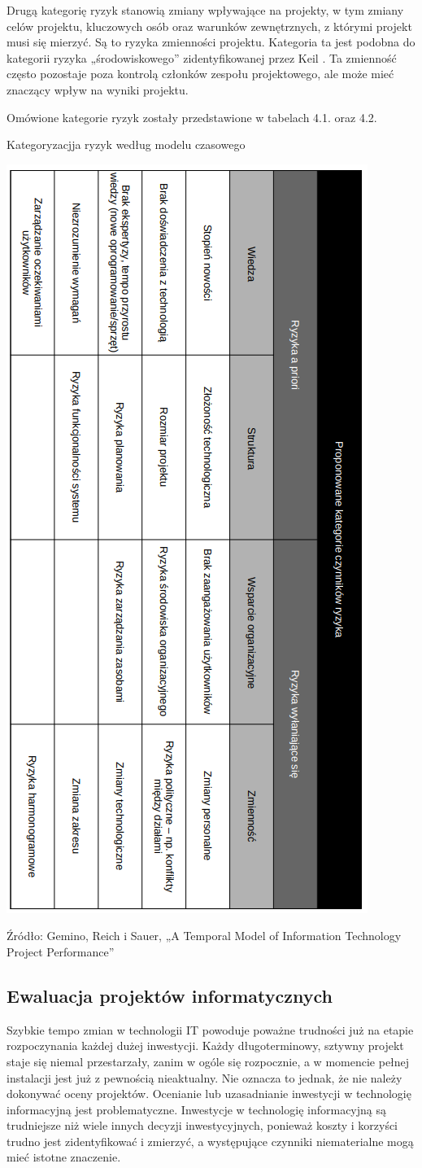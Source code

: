 Drugą kategorię ryzyk stanowią zmiany wpływające na projekty, w tym zmiany celów projektu, kluczowych osób oraz warunków zewnętrznych, z którymi projekt musi się mierzyć. Są to ryzyka zmienności projektu.\autocite{gemino} Kategoria ta jest podobna do kategorii ryzyka „środowiskowego” zidentyfikowanej przez Keil \autocite{keil}. Ta zmienność często pozostaje poza kontrolą członków zespołu projektowego, ale może mieć znaczący wpływ na wyniki projektu.\autocite{ryzyka}

Omówione kategorie ryzyk zostały przedstawione w tabelach 4.1. oraz 4.2.

\begin{table}
    \caption{Kategoryzacjja ryzyk według modelu czasowego}
    \centering
    \label{tbl:excel-table}
    \includegraphics[width=0.5\linewidth]{img/ryzyka3.png}
    \caption*{Źródło: Gemino, Reich i Sauer, „A Temporal Model of Information Technology Project Performance” }
  \end{table}


\subsection{Ewaluacja projektów informatycznych}
Szybkie tempo zmian w technologii IT powoduje poważne trudności już na etapie rozpoczynania każdej dużej inwestycji. Każdy długoterminowy, sztywny projekt staje się niemal przestarzały, zanim w ogóle się rozpocznie, a w momencie pełnej instalacji jest już z pewnością nieaktualny. Nie oznacza to jednak, że nie należy dokonywać oceny projektów. Ocenianie lub uzasadnianie inwestycji w technologię informacyjną jest problematyczne. Inwestycje w technologię informacyjną są trudniejsze niż wiele innych decyzji inwestycyjnych, ponieważ koszty i korzyści trudno jest zidentyfikować i zmierzyć, a występujące czynniki niematerialne mogą mieć istotne znaczenie. \autocite{powell1992information}

